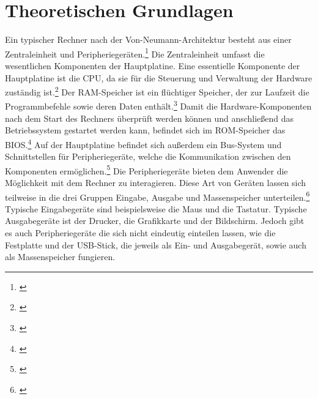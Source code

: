 \section{Theoretischen Grundlagen}
\label{sec:Theorie}
Ein typischer Rechner nach der Von-Neumann-Architektur besteht aus einer Zentraleinheit und Peripheriegeräten.\footnote{\cite[S.~92]{Herold.2012}} Die Zentraleinheit umfasst die wesentlichen Komponenten der Hauptplatine. Eine essentielle Komponente der Hauptplatine ist die \ac{CPU}, da sie für die Steuerung und Verwaltung der Hardware zuständig ist.\footnote{\cite[S.~95]{Herold.2012}} Der \ac{RAM}-Speicher ist ein flüchtiger Speicher, der zur Laufzeit die Programmbefehle sowie deren Daten enthält.\footnote{\cite[S.~96]{Herold.2012}} Damit die Hardware-Komponenten nach dem Start des Rechners überprüft werden können und anschließend das Betriebssystem gestartet werden kann, befindet sich im \ac{ROM}-Speicher  das \ac{BIOS}.\footnote{\cite[S.~96]{Herold.2012}} Auf der Hauptplatine befindet sich außerdem ein Bus-System und Schnittstellen für Peripheriegeräte, welche die Kommunikation zwischen den Komponenten ermöglichen.\footnote{\cite[S.~96]{Herold.2012}}
Die Peripheriegeräte bieten dem Anwender die Möglichkeit mit dem Rechner zu interagieren. Diese Art von Geräten lassen sich teilweise in die drei Gruppen Eingabe, Ausgabe und Massenspeicher unterteilen.\footnote{\cite[S.~118]{Herold.2012}} Typische Eingabegeräte sind beispielsweise die Maus und die Tastatur. Typische Ausgabegeräte ist der Drucker, die Grafikkarte und der Bildschirm. Jedoch gibt es auch Peripheriegeräte die sich nicht eindeutig einteilen lassen, wie die Festplatte und der USB-Stick, die jeweils als Ein- und Ausgabegerät, sowie auch als Massenspeicher fungieren.
